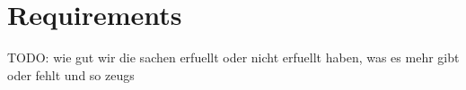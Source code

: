 \section{Requirements}\label{spec}

TODO: wie gut wir die sachen erfuellt oder nicht erfuellt haben, was es mehr gibt oder fehlt und so zeugs
